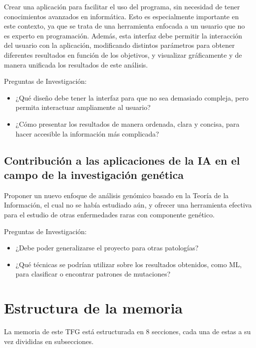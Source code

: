 \documentclass[11pt,spanish,listoffigures,listoftables]{tfgetsinf}
\begin{document}
Crear una aplicación para facilitar el uso del programa, sin necesidad de tener conocimientos avanzados en informática. Esto es especialmente importante en este contexto, ya que se trata de una herramienta enfocada a un usuario que no es experto en programación. Además, esta interfaz debe permitir la interacción del usuario con la aplicación, modificando distintos parámetros para obtener diferentes resultados en función de los objetivos, y visualizar gráficamente y de manera unificada los resultados de este análisis. 

Preguntas de Investigación: 
\begin{itemize}
\item ¿Qué diseño debe tener la interfaz para que no sea demasiado compleja, pero permita interactuar ampliamente al usuario? 
\item ¿Cómo presentar los resultados de manera ordenada, clara y concisa, para hacer accesible la información más complicada? 
\end{itemize}

\subsection{Contribución a las aplicaciones de la \acs{IA} en el campo de la investigación genética }

Proponer un nuevo enfoque de análisis genómico basado en la Teoría de la Información, el cual no se había estudiado aún, y ofrecer una herramienta efectiva para el estudio de otras enfermedades raras con componente genético. 

Preguntas de Investigación: 
\begin{itemize}
\item ¿Debe poder generalizarse el proyecto para otras patologías? 
\item ¿Qué técnicas se podrían utilizar sobre los resultados obtenidos, como \acs{ML}, para clasificar o encontrar patrones de mutaciones? 
\end{itemize}


\section{Estructura de la memoria}

La memoria de este \acs{TFG} está estructurada en 8 secciones, cada una de estas a su vez divididas en subsecciones.  
\end{document}
